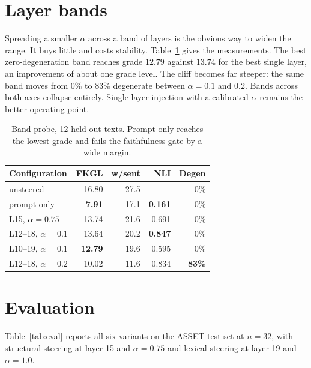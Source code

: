 \documentclass[twocolumn,10pt,a4paper]{article}
\begin{document}
\section{Layer bands}

Spreading a smaller $\alpha$ across a band of layers is the obvious way to widen
the range. It buys little and costs stability.
Table~\ref{tab:bands} gives the measurements. The best zero-degeneration band
reaches grade $12.79$ against $13.74$ for the best single layer, an improvement
of about one grade level. The cliff becomes far steeper: the same band moves from
0\% to 83\% degenerate between $\alpha = 0.1$ and $0.2$. Bands across both axes
collapse entirely. Single-layer injection with a calibrated $\alpha$ remains the
better operating point.

\begin{table}[t]
\centering
\small
\begin{tabular}{lrrrr}
\toprule
Configuration & FKGL & w/sent & NLI & Degen \\
\midrule
unsteered              & 16.80 & 27.5 & --    & 0\% \\
prompt-only            & \textbf{7.91} & 17.1 & \textbf{0.161} & 0\% \\
L15, $\alpha{=}0.75$   & 13.74 & 21.6 & 0.691 & 0\% \\
L12--18, $\alpha{=}0.1$ & 13.64 & 20.2 & \textbf{0.847} & 0\% \\
L10--19, $\alpha{=}0.1$ & \textbf{12.79} & 19.6 & 0.595 & 0\% \\
L12--18, $\alpha{=}0.2$ & 10.02 & 11.6 & 0.834 & \textbf{83\%} \\
\bottomrule
\end{tabular}
\caption{Band probe, 12 held-out texts. Prompt-only reaches the lowest grade and
fails the faithfulness gate by a wide margin.}
\label{tab:bands}
\end{table}

\section{Evaluation}

Table~\ref{tab:eval} reports all six variants on the ASSET test set at $n=32$,
with structural steering at layer 15 and $\alpha = 0.75$ and lexical steering at
layer 19 and $\alpha = 1.0$.
\end{document}
